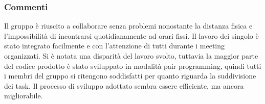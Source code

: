 \subsubsection{Commenti}
Il gruppo è riuscito a collaborare senza problemi nonostante la distanza fisica e l'impossibilità di incontrarsi
quotidianamente ad orari fissi. Il lavoro dei singolo è stato integrato facilmente e con l'attenzione di tutti durante
i meeting organizzati. Si è notata una disparità del lavoro svolto, tuttavia la maggior parte del codice prodotto è
stato sviluppato in modalità pair programming, quindi tutti i membri del gruppo si ritengono soddisfatti per quanto
riguarda la suddivisione dei task. Il processo di sviluppo adottato sembra essere efficiente, ma ancora migliorabile.

\newpage